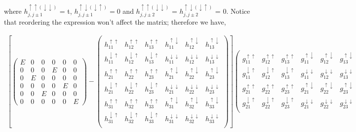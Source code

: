 \documentclass[10pt,prb,showpacs,amssymb,floatfix]{revtex4-1}
\newcommand{\dna}{\downarrow}
\newcommand{\upa}{\uparrow}
\begin{document}
where $h_{j,j\pm1}^{\upa\upa(\dna\dna)}$ = t, $h_{j,j\pm1}^{\upa\dna(\dna\upa)}=0$ and  $h_{j,j\pm2}^{\upa\upa(\dna\dna)}$ = $h_{j,j\pm2}^{\upa\dna(\dna\upa)}$ = 0. Notice that reordering the expression won't affect the matrix; therefore we have,

\begin{align}
\left[ \left(\begin{array}{cccccc} 
 E   &  0 & 0 &  0 & 0 &  0  \\
0 &  0 & 0 & E &  0 & 0 \\
 0 & E & 0 & 0 &  0 & 0 \\
 0 & 0 & 0 & 0 &  E & 0 \\
  0 & 0 & E & 0 &  0 & 0 \\
   0 & 0 & 0 & 0 &  0 & E
\end{array}\right) -
 \left(\begin{array}{cccccc} 
h_{11}^{\upa\upa}   & h_{12}^{\upa\upa} &   h_{13}^{\upa\upa} &  h_{11}^{\upa\dna}  & h_{12}^{\upa\dna}  & h_{13}^{\upa\dna}\\
h_{11}^{\dna\upa}   & h_{12}^{\dna\upa} &   h_{13}^{\dna\upa} &  h_{11}^{\dna\dna}  & h_{12}^{\dna\dna}  & h_{13}^{\dna\dna}\\
h_{21}^{\upa\upa}   & h_{22}^{\upa\upa} &   h_{23}^{\upa\upa} &  h_{21}^{\upa\dna}  & h_{22}^{\upa\dna}  & h_{23}^{\upa\dna} \\
h_{21}^{\dna\upa}   & h_{22}^{\dna\upa} &   h_{23}^{\dna\upa} &  h_{21}^{\dna\dna}  & h_{22}^{\dna\dna}  & h_{23}^{\dna\dna} \\
h_{31}^{\upa\upa}   & h_{32}^{\upa\upa} &   h_{33}^{\upa\upa}  &  h_{31}^{\upa\dna}  & h_{32}^{\upa\dna} & h_{33}^{\upa\dna} \\
h_{31}^{\dna\upa}   & h_{32}^{\dna\upa} &   h_{33}^{\dna\upa} &  h_{31}^{\dna\dna}  & h_{32}^{\dna\dna}  & h_{33}^{\dna\dna} \\
\end{array}\right) \right]
 \left(\begin{array}{cccccc} 
g_{11}^{\upa\upa}  & g_{12}^{\upa\upa}  & g_{13}^{\upa\upa} &  g_{11}^{\upa\dna}   &  g_{12}^{\upa\dna}    &  g_{13}^{\upa\dna} \\
g_{11}^{\dna\upa} & g_{12}^{\dna\upa} & g_{13}^{\dna\upa} &  g_{11}^{\dna\dna}  &  g_{12}^{\dna\dna}    &  g_{13}^{\dna\dna} \\
g_{21}^{\upa\upa}   & g_{22}^{\upa\upa} & g_{23}^{\upa\upa}  &  g_{21}^{\upa\dna}    &  g_{22}^{\upa\dna}   &  g_{23}^{\upa\dna} \\
g_{21}^{\dna\upa} & g_{22}^{\dna\upa}  & g_{23}^{\dna\upa} &  g_{21}^{\dna\dna}  &  g_{22}^{\dna\dna}    &  g_{23}^{\dna\dna} \\

\end{array}
\end{align}
\end{document}
